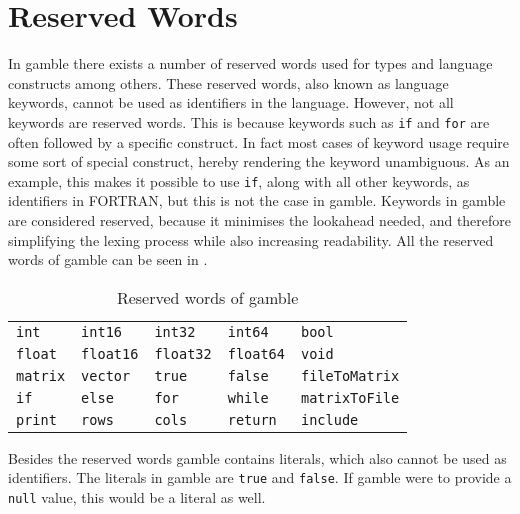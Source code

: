 \section{Reserved Words}
\label{sec:reserved_words}
In \gls{gamble} there exists a number of reserved words used for types and language constructs among others.
These reserved words, also known as language keywords, cannot be used as identifiers in the language. 
However, not all keywords are reserved words.
This is because keywords such as \texttt{if} and \texttt{for} are often followed by a specific construct.
In fact most cases of keyword usage require some sort of special construct, hereby rendering the keyword unambiguous.
As an example, this makes it possible to use \texttt{if}, along with all other keywords, as identifiers in FORTRAN, but this is not the case in \gls{gamble}.\citep{fortran_identifiers}
Keywords in \gls{gamble} are considered reserved, because it minimises the lookahead needed, and therefore simplifying the lexing process while also increasing readability.
All the reserved words of \gls{gamble} can be seen in .
\begin{table}[h!]
	\centering
	\def\arraystretch{1.5} \setlength{\tabcolsep}{2em}
	\begin{tabular}{l l l l l}
        \texttt{int}     & \texttt{int16}     & \texttt{int32}     & \texttt{int64}     & \texttt{bool}    \\
        \texttt{float}   & \texttt{float16}   & \texttt{float32}   & \texttt{float64}   & \texttt{void}    \\
        \texttt{matrix}  & \texttt{vector}    & \texttt{true}      & \texttt{false}     & \texttt{fileToMatrix} \\
        \texttt{if}      & \texttt{else}      & \texttt{for}       & \texttt{while}     & \texttt{matrixToFile} \\
        \texttt{print}   & \texttt{rows}      & \texttt{cols}      & \texttt{return}    & \texttt{include} \\
    \end{tabular}
    \caption{Reserved words of \gls{gamble}}\label{res:words}
	\def\arraystretch{1}
\end{table}

Besides the reserved words \gls{gamble} contains literals, which also cannot be used as identifiers.
The literals in \gls{gamble} are \texttt{true} and \texttt{false}.
If \gls{gamble} were to provide a \texttt{null} value, this would be a literal as well.

